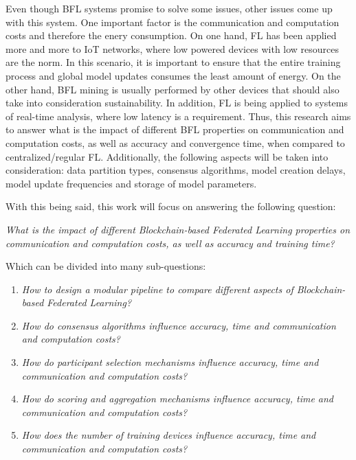 Even though BFL systems promise to solve some issues, other issues come up with this system. One important factor is the communication and computation costs and therefore the enery consumption. On one hand, FL has been applied more and more to IoT networks, where low powered devices with low resources are the norm. In this scenario, it is important to ensure that the entire training process and global model updates consumes the least amount of energy. On the other hand, BFL mining is usually performed by other devices that should also take into consideration sustainability. In addition, FL is being applied to systems of real-time analysis, where low latency is a requirement. Thus, this research aims to answer what is the impact of different BFL properties on communication and computation costs, as well as accuracy and convergence time, when compared to centralized/regular FL. Additionally, the following aspects will be taken into consideration: data partition types, consensus algorithms, model creation delays, model update frequencies and storage of model parameters.

With this being said, this work will focus on answering the following question:

\begin{center}
    \textit{What is the impact of different Blockchain-based Federated Learning properties on communication and computation costs, as well as accuracy and training time?}
\end{center}

Which can be divided into many sub-questions:

\begin{enumerate}
    \item \textit{How to design a modular pipeline to compare different aspects of Blockchain-based Federated Learning?}
    
    \item \textit{How do consensus algorithms influence accuracy, time and communication and computation costs?}
    
    \item \textit{How do participant selection mechanisms influence accuracy, time and communication and computation costs?}
    
    \item \textit{How do scoring and aggregation mechanisms influence accuracy, time and communication and computation costs?}
    
    \item \textit{How does the number of training devices influence accuracy, time and communication and computation costs?}
\end{enumerate}

